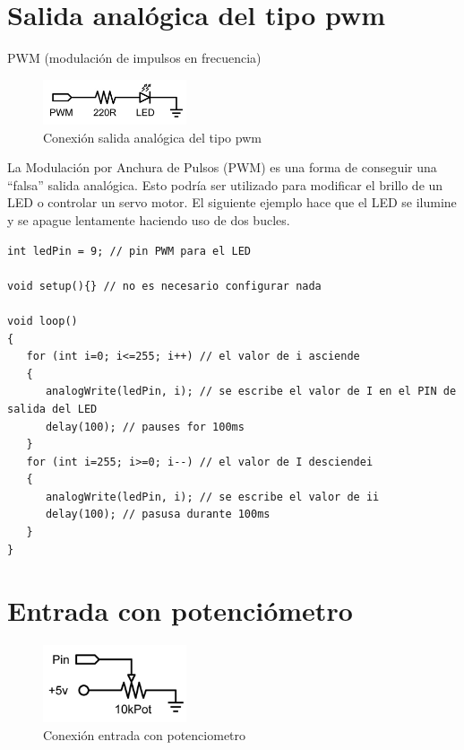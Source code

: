 \section{Salida analógica del tipo pwm}
PWM (modulación de impulsos en frecuencia)
\begin{figure}[!htp]
	\centering
	\includegraphics[width=120pt]{./Imagenes/Documentos/ArduinoNotebook_img04.png}
	\caption[Conexión salida analógica del tipo pwm]{Conexión salida analógica del tipo pwm}
\end{figure}


La Modulación por Anchura de Pulsos (PWM) es una forma de conseguir una “falsa” salida analógica. Esto podría ser utilizado para modificar el brillo de un LED o controlar un servo motor. El siguiente ejemplo hace que el LED se ilumine y se apague lentamente haciendo uso de dos bucles.
\begin{lstlisting}
int ledPin = 9; // pin PWM para el LED

void setup(){} // no es necesario configurar nada

void loop()
{
   for (int i=0; i<=255; i++) // el valor de i asciende
   {
      analogWrite(ledPin, i); // se escribe el valor de I en el PIN de salida del LED
      delay(100); // pauses for 100ms
   }
   for (int i=255; i>=0; i--) // el valor de I desciendei
   {
      analogWrite(ledPin, i); // se escribe el valor de ii
      delay(100); // pasusa durante 100ms
   }
}
\end{lstlisting}
\newpage{}
\section{Entrada con potenciómetro}
\begin{figure}[!htp]
	\centering
	\includegraphics[width=120pt]{./Imagenes/Documentos/ArduinoNotebook_img05.png}
	\caption[Conexión entrada con potenciometro]{Conexión entrada con potenciometro}
\end{figure}

